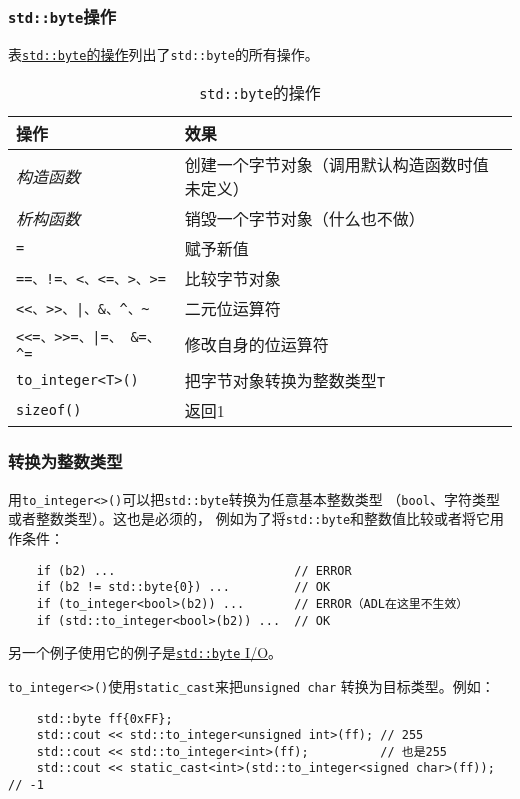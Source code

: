 \subsubsection{\texttt{std::byte}操作}
表\hyperref[t18.1]{\texttt{std::byte}的操作}列出了\texttt{std::byte}的所有操作。
\begin{table}[ht]
    \begin{tabular}{l|p{}}
        \hline
        \textbf{操作} & \textbf{效果} \\
        \hline
        \emph{构造函数} & 创建一个字节对象（调用默认构造函数时值未定义） \\
        \emph{析构函数} & 销毁一个字节对象（什么也不做） \\
        \texttt{=} & 赋予新值 \\
        \texttt{==、!=、<、<=、>、>=} & 比较字节对象 \\
        \texttt{<<、>>、|、\&、\textasciicircum、\textasciitilde} & 二元位运算符    \\
        \texttt{<<=、>>=、|=、 \&=、\textasciicircum =} & 修改自身的位运算符 \\
        \texttt{to\_integer<T>()} & 把字节对象转换为整数类型\texttt{T} \\
        \texttt{sizeof()} & 返回1 \\
        \hline
    \end{tabular}
    \caption{\texttt{std::byte}的操作}
    \label{t18.1}
\end{table}

\subsubsection*{转换为整数类型}
用\texttt{to\_integer<>()}可以把\texttt{std::byte}转换为任意基本整数类型
（\texttt{bool}、字符类型或者整数类型）。这也是必须的，
例如为了将\texttt{std::byte}和整数值比较或者将它用作条件：
\begin{lstlisting}
    if (b2) ...                         // ERROR
    if (b2 != std::byte{0}) ...         // OK
    if (to_integer<bool>(b2)) ...       // ERROR（ADL在这里不生效）
    if (std::to_integer<bool>(b2)) ...  // OK
\end{lstlisting}
另一个例子使用它的例子是\hyperref[ch18.2.2.2]{\texttt{std::byte} I/O}。

\texttt{to\_integer<>()}使用\texttt{static\_cast}来把\texttt{unsigned char}
转换为目标类型。例如：
\begin{lstlisting}
    std::byte ff{0xFF};
    std::cout << std::to_integer<unsigned int>(ff); // 255
    std::cout << std::to_integer<int>(ff);          // 也是255
    std::cout << static_cast<int>(std::to_integer<signed char>(ff)); // -1
\end{lstlisting}

